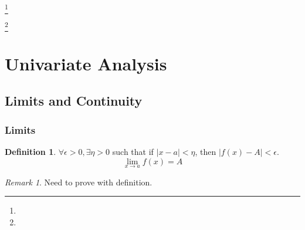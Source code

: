 \documentclass{amsart}
\theoremstyle{definition}
\newtheorem{definition}[theorem]{Definition}
\theoremstyle{remark}
\newtheorem*{remark*}{Remark}
\numberwithin{equation}{section}
\begin{document}
\title{}


\author{}
\address{}
\curraddr{}
\email{}
\thanks{}

\author{}
\address{}
\curraddr{}
\email{}
\thanks{}


\keywords{}

\date{}

\dedicatory{}

\begin{abstract}
\end{abstract}

\maketitle


\section[Univariate Analysis]{Univariate Analysis}

\subsection{Limits and Continuity}

\subsubsection{Limits}

\begin{definition}
    $\forall \epsilon > 0, \exists \eta >0$ such that if $|x - a| < \eta$, then $|f(x) - A| < \epsilon$.
    \begin{equation*}
        \lim_{x \to a} f(x) = A
    \end{equation*}
\end{definition}

\begin{remark*}
    Need to prove with definition.
\end{remark*}
\end{document}
